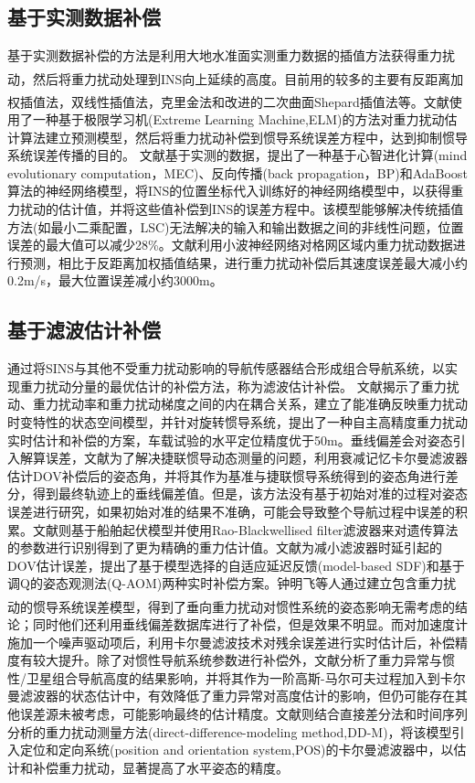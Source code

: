 \documentclass[12pt,a4,utf8]{article}
\newcommand{\upcite}[1]{\textsuperscript{\textsuperscript{\cite{#1}}}} %
\begin{document}
\subsection{基于实测数据补偿}
基于实测数据补偿的方法是利用大地水准面实测重力数据的插值方法获得重力扰动，然后将重力扰动处理到INS向上延续的高度\upcite{kwon2004gravity,arora2014fast}。目前用的较多的主要有反距离加权插值法\upcite{hofmann2006physical}，双线性插值法\upcite{sarzeaud2009optimal}，克里金法\upcite{bishop2002gravitational}和改进的二次曲面Shepard插值法\upcite{Wu2007}等。文献\cite{zhou2016novel}使用了一种基于极限学习机(Extreme Learning Machine,ELM)的方法对重力扰动估计算法建立预测模型，然后将重力扰动补偿到惯导系统误差方程中，达到抑制惯导系统误差传播的目的。
文献\cite{zhou2016improved}基于实测的数据，提出了一种基于心智进化计算(mind evolutionary computation，MEC)、反向传播(back propagation，BP)和AdaBoost算法的神经网络模型，将INS的位置坐标代入训练好的神经网络模型中，以获得重力扰动的估计值，并将这些值补偿到INS的误差方程中。该模型能够解决传统插值方法(如最小二乘配置，LSC)无法解决的输入和输出数据之间的非线性问题，位置误差的最大值可以减少28\%。文献\cite{ZHOUXIAO2016}利用小波神经网络对格网区域内重力扰动数据进行预测，相比于反距离加权插值结果，进行重力扰动补偿后其速度误差最大减小约0.2m/s，最大位置误差减小约3000m。

\subsection{基于滤波估计补偿}
通过将SINS与其他不受重力扰动影响的导航传感器结合形成组合导航系统，以实现重力扰动分量的最优估计的补偿方法，称为滤波估计补偿。
文献\cite{yang2024autonomous}揭示了重力扰动、重力扰动率和重力扰动梯度之间的内在耦合关系，建立了能准确反映重力扰动时变特性的状态空间模型，并针对旋转惯导系统，提出了一种自主高精度重力扰动实时估计和补偿的方案，车载试验的水平定位精度优于50m。垂线偏差会对姿态引入解算误差，文献\cite{an2021method}为了解决捷联惯导动态测量的问题，利用衰减记忆卡尔曼滤波器估计DOV补偿后的姿态角，并将其作为基准与捷联惯导系统得到的姿态角进行差分，得到最终轨迹上的垂线偏差值。但是，该方法没有基于初始对准的过程对姿态误差进行研究，如果初始对准的结果不准确，可能会导致整个导航过程中误差的积累。文献\cite{stepanov2020algorithms}则基于船舶起伏模型并使用Rao-Blackwellised filter滤波器来对遗传算法的参数进行识别得到了更为精确的重力估计值。文献\cite{1020386196.nh}为减小滤波器时延引起的DOV估计误差，提出了基于模型选择的自适应延迟反馈(model-based SDF)和基于调Q的姿态观测法(Q-AOM)两种实时补偿方案。钟明飞等人通过建立包含重力扰动的惯导系统误差模型\upcite{WXDH201505008015}，得到了垂向重力扰动对惯性系统的姿态影响无需考虑的结论；同时他们还利用垂线偏差数据库进行了补偿，但是效果不明显。而对加速度计施加一个噪声驱动项后，利用卡尔曼滤波技术对残余误差进行实时估计后，补偿精度有较大提升。除了对惯性导航系统参数进行补偿外，文献\cite{xiong2018analysis}分析了重力异常与惯性/卫星组合导航高度的结果影响，并将其作为一阶高斯-马尔可夫过程加入到卡尔曼滤波器的状态估计中，有效降低了重力异常对高度估计的影响，但仍可能存在其他误差源未被考虑，可能影响最终的估计精度。文献\cite{fang2013accurate}则结合直接差分法和时间序列分析的重力扰动测量方法(direct-difference-modeling method,DD-M)，将该模型引入定位和定向系统(position and orientation system,POS)的卡尔曼滤波器中，以估计和补偿重力扰动，显著提高了水平姿态的精度。
\end{document}

